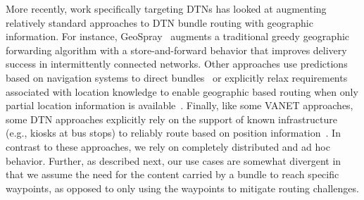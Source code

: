More recently, work specifically targeting DTNs has looked at augmenting relatively standard approaches to DTN bundle routing with geographic information. For instance, GeoSpray~\cite{soares14:geospray} augments a traditional greedy geographic forwarding algorithm with a store-and-forward behavior that improves delivery success in intermittently connected networks. Other approaches use predictions based on navigation systems to direct bundles~\cite{cheng10:geodtn} or explicitly relax requirements associated with location knowledge to enable geographic based routing when only partial location information is available~\cite{kuiper11:geographical}. Finally, like some VANET approaches, some DTN approaches explicitly rely on the support of known infrastructure (e.g., kiosks at bus stops) to reliably route based on position information~\cite{park12:position}. In contrast to these approaches, we rely on completely distributed and ad hoc behavior. Further, as described next, our use cases are somewhat divergent in that we assume the need for the content carried by a bundle to reach specific waypoints, as opposed to only using the waypoints to mitigate routing challenges.